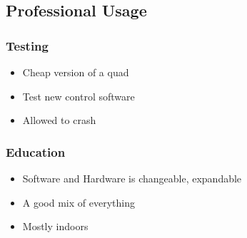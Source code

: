 \subsection{Professional Usage}



\begin{frame}
\frametitle{Testing}

  \begin{itemize}
  	\item Cheap version of a quad 
    \item Test new control software
    \item Allowed to crash  
  \end{itemize}
  
\end{frame}



\begin{frame}
\frametitle{Education}

  \begin{itemize}
  	\item Software and Hardware is changeable, expandable
  	\item A good mix of everything
  	\item Mostly indoors
  \end{itemize}
  
\end{frame}
